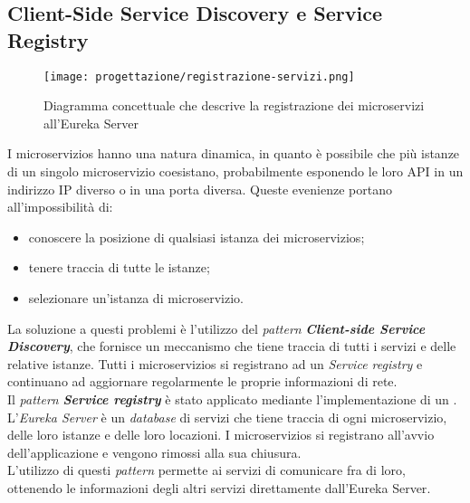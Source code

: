 \subsection{Client-Side Service Discovery e Service Registry}
\label{sub:ServiceRegistry}
\begin{figure}[H] 
    \centering 
    \texttt{[image: progettazione/registrazione-servizi.png]} 
    \caption{Diagramma concettuale che descrive la registrazione dei microservizi all'\gls{Eureka Server}}
\end{figure}
I \glspl{microservizio} hanno una natura dinamica, in quanto è possibile che più istanze di un singolo \gls{microservizio} coesistano, probabilmente esponendo le loro \gls{API} in un indirizzo \gls{IP} diverso o in una porta diversa. Queste evenienze portano all'impossibilità di: 
\begin{itemize}
    \item conoscere la posizione di qualsiasi istanza dei \glspl{microservizio};
    \item tenere traccia di tutte le istanze;
    \item selezionare un'istanza di \gls{microservizio}.
\end{itemize}
La soluzione a questi problemi è l'utilizzo del \textit{pattern} \textbf{\textit{Client-side Service Discovery}}, che fornisce un meccanismo che tiene traccia di tutti i servizi e delle relative istanze. Tutti i \glspl{microservizio} si registrano ad un \textit{Service registry} e continuano ad aggiornare regolarmente le proprie informazioni di rete.\\
Il \textit{pattern} \textbf{\textit{Service registry}} è stato applicato mediante l'implementazione di un . L'\textit{Eureka Server} è un \textit{database} di servizi che tiene traccia di ogni \gls{microservizio}, delle loro istanze e delle loro locazioni. I \glspl{microservizio} si registrano all'avvio dell'applicazione e vengono rimossi alla sua chiusura.\\
L'utilizzo di questi \textit{pattern}  permette ai servizi di comunicare fra di loro, ottenendo le informazioni degli altri servizi direttamente dall'\gls{Eureka Server}.
